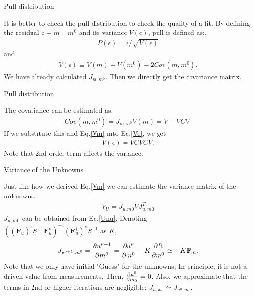 \documentclass[
	xcolor=dvipsnames,
	10pt, 
	]{beamer}
\begin{document}
\begin{frame}{Pull distribution}
	\begin{block}{}
		It is better to check the pull distribution to check the quality of a fit. By defining the residual $\epsilon = m-m^0$ and its variance $V(\epsilon)$, pull is defined as:, 
		\begin{align}
			P(\epsilon) = \epsilon/\sqrt{V(\epsilon)}
		\end{align}
		and
		\begin{align}
			V(\epsilon) \equiv V(m)+ V(m^0) - 2 Cov(m,m^0).\label{Ve}
		\end{align}
		We have already calculated $J_{m,m^0}$. Then we directly get the covariance matrix. 
	\end{block}
\end{frame} 
\begin{frame}{Pull distribution}
	\begin{block}{}
		The covariance can be estimated as:
		\begin{align}
			Cov(m,m^0) = J_{m,m^0}V(m) = V - VCV.
		\end{align}
		If we substitute this and Eq.\eqref{Vm} into Eq.\eqref{Ve}, we get
		\begin{align}
			V(\epsilon) = VCVCV.
		\end{align}
		Note that 2nd order term affects the variance.	
	\end{block}
\end{frame}
\begin{frame}{Variance of the Unknowns}
	\begin{block}{}
		Just like how we derived  Eq.\eqref{Vm} we can estimate the variance matrix of the unknowns. 
		\vspace{-3 mm}
		\begin{align}
			V_U = J_{u,m0} V J_{u,m0}^T
		\end{align}
		$J_{u,m0}$ can be obtained from Eq.\eqref{Unu}. Denoting\\ $((\mathbf{F}_u^\dagger)^\nu S^{-1}\mathbf F^\nu_u)^{-1}(\mathbf{F}_u^\dagger)^\nu S^{-1}$ as $K$, 
		\vspace{-3 mm}
		\begin{align}
			J_{u^{\nu+1},m^0} = \frac{\partial u^{\nu+1}}{\partial m^0} = \frac{\partial u^{\nu}}{\partial m^0} - K\frac{\partial R}{\partial m^0} \simeq -K \mathbf{F}_m.
		\end{align}
		Note that we only have initial "Guess" for the unknowns; In principle, it is not a driven value from measurements. Then, $\frac{\partial u^0}{\partial m_0} = 0$. Also, we approximate that the terms in 2nd or higher iterations are negligible: $J_{u,m^0}\simeq J_{u^0,m^0}$.
	\end{block}
\end{frame}
\end{document}
